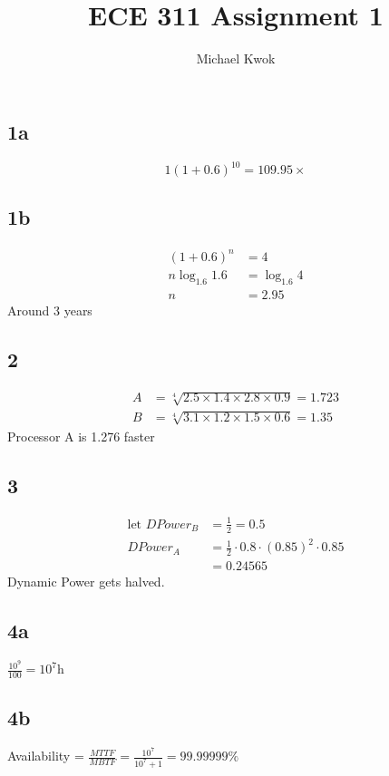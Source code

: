 \documentclass{article}
\title{ECE 311 Assignment 1}
\author{Michael Kwok}
\begin{document}
\maketitle
\begin{multicols}{2}
    \subsection*{1a}
    \[
        1 {\left(1+0.6\right)}^{10} = 109.95 \times
    \]
    \subsection*{1b}
    \begin{align*}
        {\left(1+0.6\right)}^{n} & = 4           \\
        n \log_{1.6}1.6          & = \log_{1.6}4 \\
        n                        & = 2.95
    \end{align*}
    Around 3 years
    \subsection*{2}
    \begin{align*}
        A & = \sqrt[4]{2.5 \times 1.4 \times 2.8 \times 0.9} = 1.723 \\
        B & = \sqrt[4]{3.1 \times 1.2 \times 1.5 \times 0.6} = 1.35
    \end{align*}
    Processor A is 1.276\times{} faster
    \subsection*{3}
    \begin{align*}
        \text{let } DPower_B & = \frac{1}{2} = 0.5                                 \\
        DPower_A             & = \frac{1}{2} \cdot 0.8 \cdot {(0.85)}^2 \cdot 0.85 \\
                             & = 0.24565
    \end{align*}
    Dynamic Power gets halved.
    \subsection*{4a}
    \(\frac{10^9}{100} = 10^7 \si{\hour}\)
    \subsection*{4b}
    Availability = \( \frac{MTTF}{MBTF} = \frac{10^7}{10^7+1} = 99.99999\% \)

\end{multicols}
\end{document}
